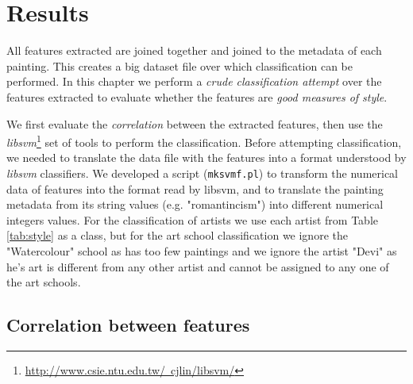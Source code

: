 \documentclass[11pt,a4paper,twoside,openright,draft]{report}
\begin{document}
\chapter{Results}
\label{chap:results}
\begin{multicols}{2}

All features extracted are joined together and joined to the metadata of each
painting.  This creates a big dataset file over which classification can be
performed.  In this chapter we perform a \emph{crude classification attempt}
over the features extracted to evaluate whether the features are \emph{good
measures of style}. 

We first evaluate the \emph{correlation} between the extracted features, then
use the \emph{libsvm}\footnote{\href{http://www.csie.ntu.edu.tw/~cjlin/libsvm/}
{http://www.csie.ntu.edu.tw/~cjlin/libsvm/}} set of tools to perform the
classification.  Before attempting classification, we needed to translate the
data file with the features into a format understood by \emph{libsvm}
classifiers.  We developed a script (\texttt{mksvmf.pl}) to transform the
numerical data of features into the format read by libsvm, and to translate the
painting metadata from its string values (e.g. "romantincism") into different
numerical integers values.  For the classification of artists we use each
artist from Table \ref{tab:style} as a class, but for the art school
classification we ignore the "Watercolour" school as has too few paintings and
we ignore the artist "Devi" as he's art is different from any other artist and
cannot be assigned to any one of the art schools.




\section{Correlation between features}


\end{multicols}
\end{document}
